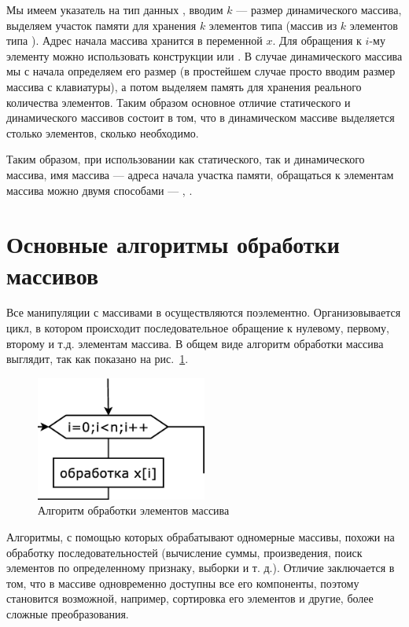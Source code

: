 Мы имеем указатель на тип данных , вводим $k$ --- размер динамического массива, выделяем
участок памяти для хранения $k$ элементов типа  (массив из
$k$  элементов типа ). Адрес начала массива хранится в переменной
$x$. Для обращения к $i$-му элементу можно использовать конструкции  или
. В случае динамического массива мы с начала определяем его размер (в простейшем случае просто
вводим размер массива с клавиатуры), а потом выделяем память для хранения реального количества элементов. Таким образом
основное отличие статического и динамического массивов состоит в том, что в динамическом массиве выделяется столько
элементов, сколько необходимо.

Таким образом, при использовании как статического, так и динамического массива, имя массива --- адреса начала участка
памяти, обращаться к элементам массива можно двумя способами --- , .

\section[Основные алгоритмы обработки массивов]{Основные алгоритмы обработки массивов}
Все манипуляции с массивами в  осуществляются поэлементно. Организовывается цикл, в котором происходит
последовательное обращение к нулевому, первому, второму и т.д. элементам массива. В общем виде алгоритм обработки
массива выглядит, так как показано на рис.~\ref{ch05:refDrawing0}.

\begin{figure}[htb]
\begin{center}
\includegraphics[width=0.5\textwidth]{img/ris_5_1}
\caption{Алгоритм обработки элементов массива}
\label{ch05:refDrawing0}
\end{center}
\end{figure}

Алгоритмы, с помощью которых обрабатывают одномерные массивы, похожи на обработку последовательностей (вычисление суммы,
произведения, поиск элементов по определенному признаку, выборки и т. д.). Отличие заключается в том, что в массиве
одновременно доступны все его компоненты, поэтому становится возможной, например, сортировка его элементов и другие,
более сложные преобразования.

